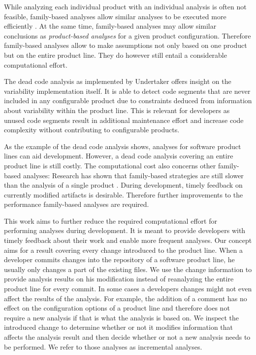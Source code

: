 \documentclass[a4paper]{article}
\begin{document}
While analyzing each individual product with an individual analysis is often not feasible, family-based analyses allow similar analyses to be executed more efficiently \cite{Thum:2014:CSA:2620784.2580950}. At the same time, family-based analyses may allow similar conclusions as \emph{product-based analyses} for a given product configuration. Therefore family-based analyses allow to make assumptions not only based on one product but on the entire product line. They do however still entail a considerable computational effort.

The dead code analysis as implemented by Undertaker \cite{Tartler:2011:FCC:1966445.1966451} offers insight on the variability implementation itself. It is able to detect code segments that are never included in any configurable product due to constraints deduced from information about variability within the product line. This is relevant for developers as unused code segments result in additional maintenance effort and increase code complexity without contributing to configurable products. 

As the example of the dead code analysis shows, analyses for software product lines can aid development. However, a dead code analysis covering an entire product line is still costly. The computational cost also concerns other family-based analyses: Research has shown that family-based strategies are still slower than the analysis of a single product \cite{Thum:2014:CSA:2620784.2580950}. During development, timely feedback on currently modified artifacts is desirable. Therefore further improvements to the performance family-based analyses are required.  

This work aims to further reduce the required computational effort for performing analyses during development. It is meant to provide developers with timely feedback about their work and enable more frequent analyses. Our concept aims for a result covering every change introduced to the product line. When a developer commits changes into the repository of a software product line, he usually only changes a part of the existing files. We use the change information to provide analysis results on his modification instead of reanalyzing the entire product line for every commit. In some cases a developers changes might not even affect the results of the analysis. For example, the addition of a comment has no effect on the configuration options of a product line and therefore does not require a new analysis if that is what the analysis is based on. We inspect the introduced change to determine whether or not it modifies information that affects the analysis result and then decide whether or not a new analysis needs to be performed. We refer to those analyses as incremental analyses.
\end{document}
